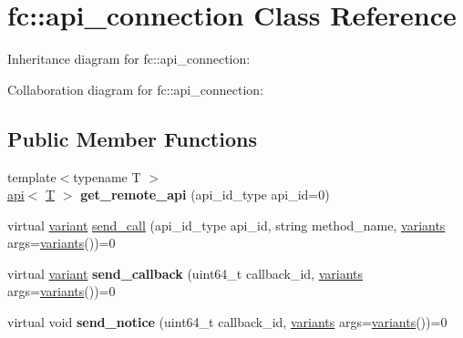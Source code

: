\hypertarget{classfc_1_1api__connection}{}\section{fc\+:\+:api\+\_\+connection Class Reference}
\label{classfc_1_1api__connection}


Inheritance diagram for fc\+:\+:api\+\_\+connection\+:


Collaboration diagram for fc\+:\+:api\+\_\+connection\+:
\subsection*{Public Member Functions}
\begin{DoxyCompactItemize}
\item 
\mbox{\label{classfc_1_1api__connection_a0cbbf236b38b8d2cbec418e4663c1d38}} 
{\footnotesize template$<$typename T $>$ }\\\mbox{\hyperlink{classfc_1_1api}{api}}$<$ \mbox{\hyperlink{struct_t}{T}} $>$ {\bfseries get\+\_\+remote\+\_\+api} (api\+\_\+id\+\_\+type api\+\_\+id=0)
\item 
virtual \mbox{\hyperlink{classfc_1_1variant}{variant}} \mbox{\hyperlink{classfc_1_1api__connection_a38d046b1803e1242ce10f36c694b9dea}{send\+\_\+call}} (api\+\_\+id\+\_\+type api\+\_\+id, string method\+\_\+name, \mbox{\hyperlink{classstd_1_1vector}{variants}} args=\mbox{\hyperlink{classstd_1_1vector}{variants}}())=0
\item 
\mbox{\label{classfc_1_1api__connection_ae2a0f9123066ff0df3445ee86ee982d5}} 
virtual \mbox{\hyperlink{classfc_1_1variant}{variant}} {\bfseries send\+\_\+callback} (uint64\+\_\+t callback\+\_\+id, \mbox{\hyperlink{classstd_1_1vector}{variants}} args=\mbox{\hyperlink{classstd_1_1vector}{variants}}())=0
\item 
\mbox{\label{classfc_1_1api__connection_acc9e1ac12402ebf9dcb3be57035a2623}} 
virtual void {\bfseries send\+\_\+notice} (uint64\+\_\+t callback\+\_\+id, \mbox{\hyperlink{classstd_1_1vector}{variants}} args=\mbox{\hyperlink{classstd_1_1vector}{variants}}())=0
\item 
\mbox{\label{classfc_1_1api__connection_aee1166b3d1f739ffd7759cf02b2e7efa}} 

\end{DoxyCompactItemize}
